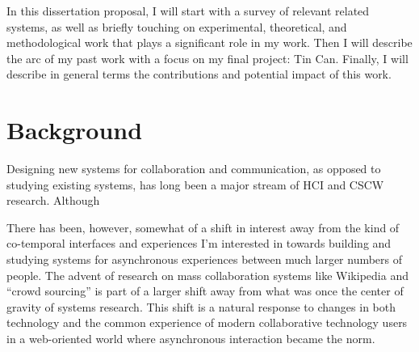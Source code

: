 \documentclass{tufte-handout}
\begin{document}


In this dissertation proposal, I will start with a survey of relevant related systems, as well as briefly touching on experimental, theoretical, and methodological work that plays a significant role in my work. Then I will describe the arc of my past work with a focus on my final project: Tin Can. Finally, I will describe in general terms the contributions and potential impact of this work.



\section{Background}

Designing new systems for collaboration and communication, as opposed to studying existing systems, has long been a major stream of HCI and CSCW research. Although 



There has been, however, somewhat of a shift in interest away from the kind of co-temporal interfaces and experiences I'm interested in towards building and studying systems for asynchronous experiences between much larger numbers of people. The advent of research on mass collaboration systems like Wikipedia \cite{kittur} and ``crowd sourcing'' \cite{bernstein} is part of a larger shift away from what was once the center of gravity of systems research. This shift is a natural response to changes in both technology and the common experience of modern collaborative technology users in a web-oriented world where asynchronous interaction became the norm.
\end{document}
